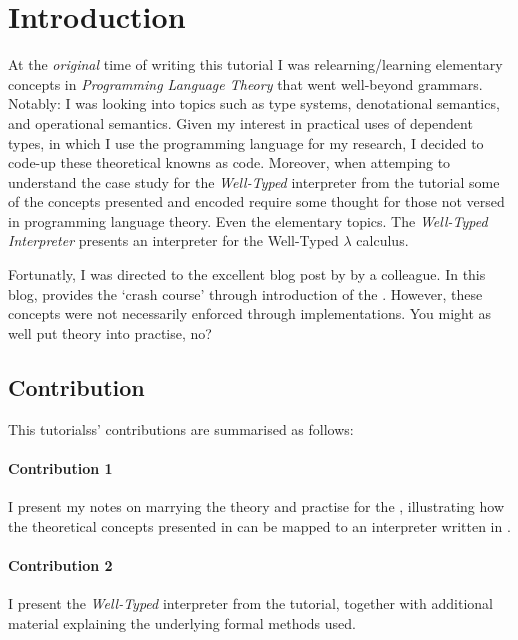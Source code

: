 \section{Introduction}
\label{sec:intro}

At the \emph{original} time of writing this tutorial I was relearning/learning elementary concepts in \emph{Programming Language Theory} that went well-beyond grammars.
Notably: I was looking into topics such as type systems, denotational semantics, and operational semantics.
Given my interest in practical uses of dependent types, in which I use the \idris{} programming language for my research, I decided to code-up these theoretical knowns as \idris{} code.
Moreover, when attemping to understand the case study for the \emph{Well-Typed} interpreter from the \idris{} tutorial \cite[Section~6]{Community2014} some of the concepts presented and encoded require some thought for those not versed in programming language theory.
Even the elementary topics.
The \emph{Well-Typed Interpreter} presents an interpreter for the Well-Typed $\lambda$ calculus.

Fortunatly, I was directed to the excellent blog post  by \citeauthor{Siek2012ccp} \cite{Siek2012ccp} by a colleague.
In this blog, \citeauthor{Siek2012ccp} provides the `crash course' through introduction of the \allang{}.
However, these concepts were not necessarily enforced through implementations.
You might as well put theory into practise, no?

\subsection{Contribution}
\label{sec:intro:contribution}

This tutorialss' contributions are summarised as follows:

\paragraph{Contribution 1}
I present my notes on marrying the theory and practise for the \allang{}, illustrating how the theoretical concepts presented in \citet{Siek2012ccp} can be mapped to an interpreter written in \idris{}.

\paragraph{Contribution 2}
I present the \emph{Well-Typed} interpreter from the \idris{} tutorial, together with additional material explaining the underlying formal methods used.

